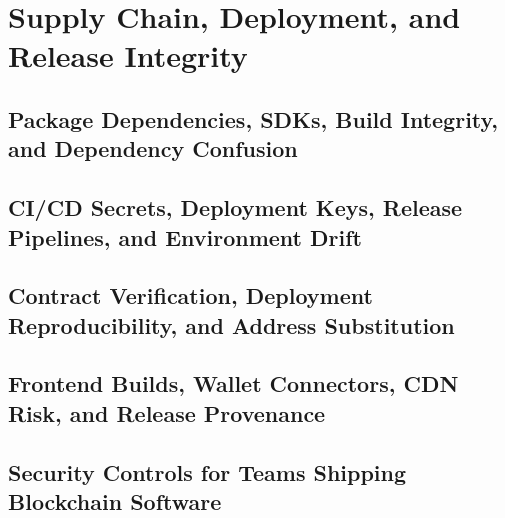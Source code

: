 \chapter{Supply Chain, Deployment, and Release Integrity}

\section{Package Dependencies, SDKs, Build Integrity, and Dependency Confusion}

\section{CI/CD Secrets, Deployment Keys, Release Pipelines, and Environment Drift}

\section{Contract Verification, Deployment Reproducibility, and Address Substitution}

\section{Frontend Builds, Wallet Connectors, CDN Risk, and Release Provenance}

\section{Security Controls for Teams Shipping Blockchain Software}
